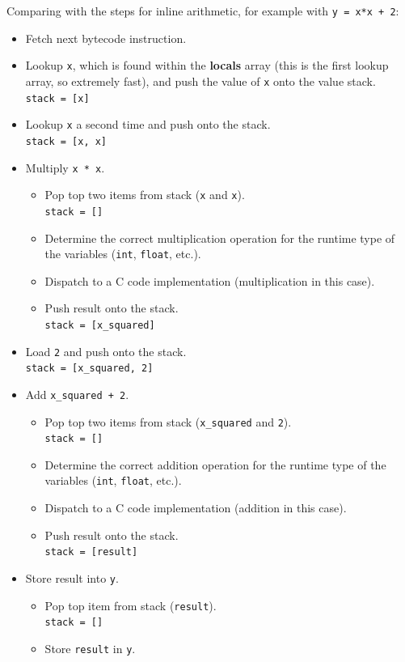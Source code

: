 \documentclass[../main.tex]{subfiles}
\begin{document}
    Comparing with the steps for inline arithmetic, for example with \verb|y = x*x + 2|:
    \begin{itemize}
        \item Fetch next bytecode instruction.
        \item Lookup \verb|x|, which is found within the \textbf{locals} array (this is the first lookup array, so extremely fast), and push the value of \verb|x| onto the value stack.
        \\ \verb|stack = [x]|
        \item Lookup \verb|x| a second time and push onto the stack.
        \\ \verb|stack = [x, x]|
        \item Multiply \verb|x * x|.
        \begin{itemize}
            \item Pop top two items from stack (\verb|x| and \verb|x|).
            \\ \verb|stack = []|
            \item Determine the correct multiplication operation for the runtime type of the variables (\verb|int|, \verb|float|, etc.).
            \item Dispatch to a C code implementation (multiplication in this case).
            \item Push result onto the stack.
            \\ \verb|stack = [x_squared]|
        \end{itemize}
        \item Load \verb|2| and push onto the stack.
        \\ \verb|stack = [x_squared, 2]|
        \item Add \verb|x_squared + 2|.
        \begin{itemize}
            \item Pop top two items from stack (\verb|x_squared| and \verb|2|).
            \\ \verb|stack = []|
            \item Determine the correct addition operation for the runtime type of the variables (\verb|int|, \verb|float|, etc.).
            \item Dispatch to a C code implementation (addition in this case).
            \item Push result onto the stack.
            \\ \verb|stack = [result]|
        \end{itemize}
        \item Store result into \verb|y|.
        \begin{itemize}
            \item Pop top item from stack (\verb|result|).
            \\ \verb|stack = []|
            \item Store \verb|result| in \verb|y|.
        \end{itemize}
    \end{itemize}
\end{document}

